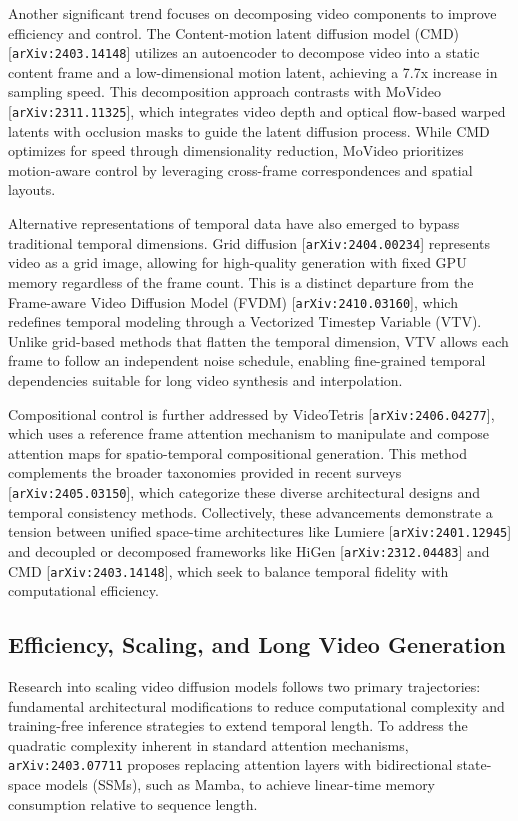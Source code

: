 \documentclass[11pt]{article}
\begin{document}
Another significant trend focuses on decomposing video components to improve efficiency and control. The Content-motion latent diffusion model (CMD) [\texttt{arXiv:2403.14148}] utilizes an autoencoder to decompose video into a static content frame and a low-dimensional motion latent, achieving a 7.7x increase in sampling speed. This decomposition approach contrasts with MoVideo [\texttt{arXiv:2311.11325}], which integrates video depth and optical flow-based warped latents with occlusion masks to guide the latent diffusion process. While CMD optimizes for speed through dimensionality reduction, MoVideo prioritizes motion-aware control by leveraging cross-frame correspondences and spatial layouts.

Alternative representations of temporal data have also emerged to bypass traditional temporal dimensions. Grid diffusion [\texttt{arXiv:2404.00234}] represents video as a grid image, allowing for high-quality generation with fixed GPU memory regardless of the frame count. This is a distinct departure from the Frame-aware Video Diffusion Model (FVDM) [\texttt{arXiv:2410.03160}], which redefines temporal modeling through a Vectorized Timestep Variable (VTV). Unlike grid-based methods that flatten the temporal dimension, VTV allows each frame to follow an independent noise schedule, enabling fine-grained temporal dependencies suitable for long video synthesis and interpolation.

Compositional control is further addressed by VideoTetris [\texttt{arXiv:2406.04277}], which uses a reference frame attention mechanism to manipulate and compose attention maps for spatio-temporal compositional generation. This method complements the broader taxonomies provided in recent surveys [\texttt{arXiv:2405.03150}], which categorize these diverse architectural designs and temporal consistency methods. Collectively, these advancements demonstrate a tension between unified space-time architectures like Lumiere [\texttt{arXiv:2401.12945}] and decoupled or decomposed frameworks like HiGen [\texttt{arXiv:2312.04483}] and CMD [\texttt{arXiv:2403.14148}], which seek to balance temporal fidelity with computational efficiency.

\subsection{Efficiency, Scaling, and Long Video Generation}

Research into scaling video diffusion models follows two primary trajectories: fundamental architectural modifications to reduce computational complexity and training-free inference strategies to extend temporal length. To address the quadratic complexity inherent in standard attention mechanisms, \texttt{arXiv:2403.07711} proposes replacing attention layers with bidirectional state-space models (SSMs), such as Mamba, to achieve linear-time memory consumption relative to sequence length.
\end{document}
